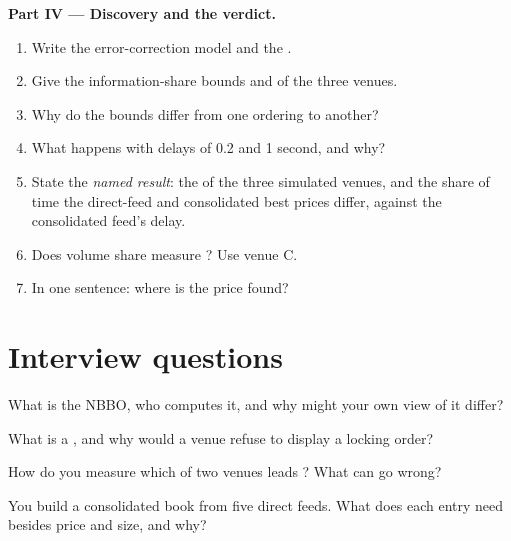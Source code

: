 \begin{problem}
\medskip\noindent\textbf{Part IV --- Discovery and the verdict.}
\begin{enumerate}[resume]
\item Write the error-correction model and the .
\item Give the information-share bounds and  of the three venues.
\item Why do the bounds differ from one ordering to another?
\item What happens with delays of 0.2 and 1 second, and why?
\item State the \emph{named result}: the  of the three simulated venues, and the share of time the direct-feed and consolidated best
prices differ, against the consolidated feed's delay.
\item Does volume share measure ? Use venue C.
\item In one sentence: where is the price found?
\end{enumerate}
\end{problem}

\section{Interview questions}

\begin{interviewq}\label{iq:mx:fragmentation-and-routing:1}
What is the NBBO, who computes it, and why might your own view of it differ?
\end{interviewq}

\begin{interviewq}\label{iq:mx:fragmentation-and-routing:2}
What is a , and why would a venue refuse to display a locking order?
\end{interviewq}

\begin{interviewq}\label{iq:mx:fragmentation-and-routing:3}
How do you measure which of two venues leads ? What can go wrong?
\end{interviewq}

\begin{interviewq}\label{iq:mx:fragmentation-and-routing:4}
You build a consolidated book from five direct feeds. What does each entry need besides price and size, and why?
\end{interviewq}


